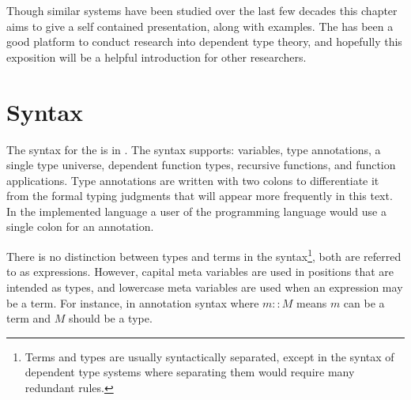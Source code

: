Though similar systems have been studied over the last few decades this chapter aims to give a self contained presentation, along with examples.
The \slang{} has been a good platform to conduct research into \fullSp{} dependent type theory, and hopefully this exposition will be a helpful introduction for other researchers.
 
\section{\SLang{} Syntax}
 
The syntax for the \slang{} is in .
The syntax supports: variables, type annotations, a single type universe, dependent function types, recursive functions, and function applications.
Type annotations are written with two colons to differentiate it from the formal typing judgments that will appear more frequently in this text.
In the implemented language a user of the programming language would use a single colon for an annotation.
 
There is no distinction between types and terms in the syntax\footnote{
  Terms and types are usually syntactically separated, except in the syntax of \fullSp{} dependent type systems where separating them would require many redundant rules.
}, both are referred to as expressions.
However, capital meta variables are used in positions that are intended as types, and lowercase meta variables are used when an expression may be a term.
For instance, in annotation syntax where $m::M$ means $m$ can be a term and $M$ should be a type.
 
 

